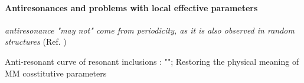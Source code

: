 \paragraph{Antiresonances and problems with local effective parameters}

\begin{displayquote}
\textit{antiresonance "may not" come from periodicity, as it is also observed in random structures}  (Ref. \cite{wallen2010})
\end{displayquote}
Anti-resonant curve  of resonant inclusions : ""; %
Restoring the physical meaning of MM cosstitutive parameters %

